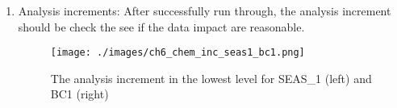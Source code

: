 \begin{enumerate}
\begin{itemize}
\begin{scriptsize}
\begin{verbatim}
pcgsoi: gnorm(1:2),b=  1.254432996913E-06  1.254434051E-06  2.97203315E-01
cost,grad,step,b,step? =   2  16  3.15885215E+03  1.12001473E-03  2.3966297E-01  2.9720331E-01  good
PCGSOI: WARNING **** Stopping inner iteration ***
gnorm  0.534787149781733860E-10 less than  0.100000004E-09
update_guess: successfully complete
\end{scriptsize}
\end{tiny}

\item Update chemical background fields:
\begin{scriptsize}
\begin{verbatim}
  ...
  k,max,min,mid var=sulf                                     38  9.1036431E-02
  4.5203370E-07  1.8112745E-02
  k,max,min,mid var=sulf                                     39  2.5694052E-02
  6.2565640E-08  5.7557132E-03
  k,max,min,mid var=sulf                                     40  1.1622031E-02
  1.4633585E-09  8.4061045E-03
  rmse_var=sulf
  ...
\end{verbatim}
\end{scriptsize}

\end{itemize}

\item Analysis increments:
After successfully run through, the analysis increment should be check the see if the data impact are reasonable.
\begin{figure}[h!]
  \centering
  \texttt{[image: ./images/ch6\_chem\_inc\_seas1\_bc1.png]}
  \caption{The analysis increment in the lowest level for SEAS\_1 (left) and BC1 (right)}
  \label{fig:chem}
\end{figure}


\end{enumerate}






